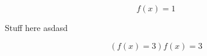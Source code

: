 \documentclass{minimal}
\begin{document}
\[
  f(x) = 1
\]

{Stuff here
    asdasd}

\begin{equation}
   \left(
     f(x) = 3
  \right)
  \left.
      f(x) = 3
\right.
\end{equation}
\end{document}
